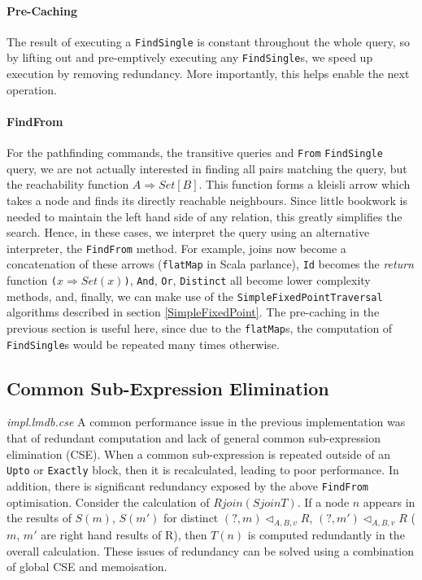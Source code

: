\documentclass[12pt,a4paper,twoside,openright]{report}
\newcommand\codeName[1]{\texttt{#1}}
\newcommand\note[1]{\textit{#1}}
\newcommand\mathName[1]{\textit{#1}}
\newcommand{\opRule}[3]{#1 \triangleleft_{#2, v} #3}
\begin{document}
		\paragraph{Pre-Caching}
		The result of executing a \codeName{FindSingle} is constant throughout the whole query, so by lifting out and pre-emptively executing any \codeName{FindSingle}s, we speed up execution by removing redundancy. More importantly, this helps enable the next operation.
		
		\paragraph{FindFrom}
		For the pathfinding commands, the transitive queries and \codeName{From} \codeName{FindSingle} query, we are not actually interested in finding all pairs matching the query, but the reachability function \codeName{$A \Rightarrow Set[B]$}. This function forms a kleisli arrow which takes a node and finds its directly reachable neighbours. Since little bookwork is needed to maintain the left hand side of any relation, this greatly simplifies the search. Hence, in these cases, we interpret the query using an alternative interpreter, the \codeName{FindFrom} method. For example, joins now become a concatenation of these arrows (\codeName{flatMap}  in Scala parlance), \codeName{Id} becomes the \mathName{return} function \codeName{($x \Rightarrow Set(x)$)}, \codeName{And}, \codeName{Or}, \codeName{Distinct} all become lower complexity methods, and, finally, we can make use of the \codeName{SimpleFixedPointTraversal} algorithms described in section \ref{SimpleFixedPoint}. The pre-caching in the previous section is useful here, since due to the \codeName{flatMap}s, the computation of \codeName{FindSingle}s would be repeated many times otherwise.

	\subsection{Common Sub-Expression Elimination}
	\note{impl.lmdb.cse}
	A common performance issue in the previous implementation was that of redundant computation and lack of general common sub-expression elimination (CSE). When a common sub-expression is repeated outside of an \codeName{Upto} or \codeName{Exactly} block, then it is recalculated, leading to poor performance. In addition, there is significant redundancy exposed by the above \codeName{FindFrom} optimisation. Consider the calculation of $R join (S join T)$. If a node $n$ appears in the results of $S(m)$, $S(m')$ for distinct $\opRule{(?, m)}{A, B}{R}$, $\opRule{(?, m')}{A, B}{R}$ ($m$, $m'$ are right hand results of R), then $T(n)$ is computed redundantly in the overall calculation. These issues of redundancy can be solved using a combination of global CSE and memoisation.
\end{document}
